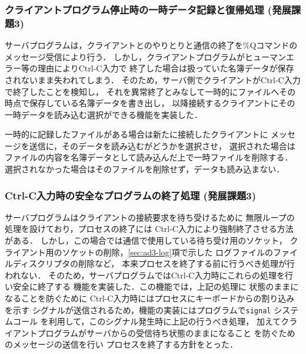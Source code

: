 \subsubsection{クライアントプログラム停止時の一時データ記録と復帰処理 (発展課題3)} \label{sec:ad3-original}
サーバプログラムは，クライアントとのやりとりと通信の終了を\%Qコマンドのメッセージ受信により行う．
しかし，クライアントプログラムがヒューマンエラー等の理由によりCtrl-C入力で
終了した場合は扱っていた名簿データが保存されないまま失われてしまう．
そのため，サーバ側でクライアントがCtrl-C入力で終了したことを検知し，
それを異常終了とみなして一時的にファイルへその時点で保存している名簿データを書き出し，
以降接続するクライアントにその一時データを読み込む選択ができる機能を実装した．

一時的に記録したファイルがある場合は新たに接続したクライアントに
メッセージを送信に，そのデータを読み込むがどうかを選択させ，
選択された場合はファイルの内容を名簿データとして読み込んだ上で一時ファイルを削除する．
選択されなかった場合はそのファイルを削除せず，データも読み込まない．

\subsubsection{Ctrl-C入力時の安全なプログラムの終了処理 (発展課題3)} \label{sec:ad3-crtlc}
サーバプログラムはクライアントの接続要求を待ち受けるために
無限ループの処理を設けており，プロセスの終了には
Ctrl-C入力により強制終了させる方法がある．
しかし，この場合では通信で使用している待ち受け用のソケット，
クライアント用のソケットの削除，\ref{sec:ad3-log}項で示した
ログファイルのファイルディスクリプタの削除など，
本来プロセスを終了する前に行うべき処理が行われない．
そのため，サーバプログラムではCtrl-C入力時にこれらの処理を行い安全に終了する
機能を実装した．この機能では，上記の処理に
状態のままになることを防ぐために
Ctrl-C入力時にはプロセスにキーボードからの割り込みを示す
シグナルが送信されるため，機能の実装にはプログラムで\verb|signal| システムコール
を利用して，このシグナル発生時に上記の行うべき処理，
加えてクライアントプログラムがサーバからの受信待ち状態のままになること
を防ぐためのメッセージの送信を行い
プロセスを終了する方針をとった．

